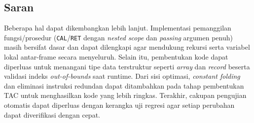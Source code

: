 \subsection{Saran}

Beberapa hal dapat dikembangkan lebih lanjut. Implementasi pemanggilan
fungsi/prosedur (\texttt{CAL}/\texttt{RET} dengan \emph{nested scope} dan
\emph{passing} argumen penuh) masih bersifat dasar dan dapat dilengkapi agar
mendukung rekursi serta variabel lokal antar-frame secara menyeluruh. Selain itu,
pembentukan kode dapat diperluas untuk menangani tipe data terstruktur seperti
\emph{array} dan \emph{record} beserta validasi indeks \emph{out-of-bounds} saat
runtime. Dari sisi optimasi, \emph{constant folding} dan eliminasi instruksi
redundan dapat ditambahkan pada tahap pembentukan TAC untuk menghasilkan kode yang
lebih ringkas. Terakhir, cakupan pengujian otomatis dapat diperluas dengan kerangka
uji regresi agar setiap perubahan dapat diverifikasi dengan cepat.
